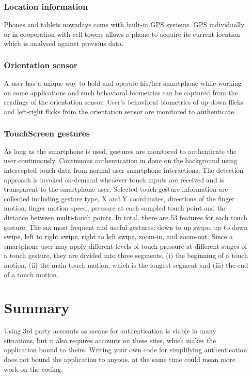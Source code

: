 \subsubsection{Location information}
Phones and tablets nowadays come with built-in GPS systems. GPS individually or in cooperation with cell towers allows a phone to acquire its current location which is analysed against previous data.  \cite{takamizawa2012authentication}

\subsubsection{Orientation sensor}
A user has a unique way to hold and operate his/her smartphone while working on some applications and such behavioral biometrics can be captured from the readings of the orientation sensor. User’s behavioral biometrics of up-down flicks and left-right flicks from the orientation sensor are monitored to authenticate. \citep{lin2012new}

\subsubsection{TouchScreen gestures}
As long as the smartphone is used, gestures are monitored to authenticate the user continuously.
Continuous authentication in done on the background using intercepted touch data from
normal user-smartphone interactions. The detection approach is invoked on-demand whenever touch inputs are received and is transparent to the smartphone user. Selected touch gesture information are collected including gesture type, X and Y coordinates, directions of the finger motion, finger motion speed, pressure at each sampled touch point and the distance between multi-touch points. In total, there are 53 features for each touch gesture. The six most frequent and useful gestures: down to up swipe, up to down swipe, left to right swipe, right to left swipe, zoom-in, and zoom-out. Since a smartphone user may apply different levels of touch pressure at different stages of a touch gesture, they are divided into three segments, (i) the
beginning of a touch motion, (ii) the main touch motion, which
is the longest segment and (iii) the end of a touch motion. \cite{feng2012continuous, li2013unobservable}

\section{Summary}
Using 3rd party accounts as means for authentication is viable in many situations, but it also requires accounts on these sites, which makes the application bound to theirs. Writing your own code for simplifying authentication does not bound the application to anyone, at the same time could mean more work on the coding. 


